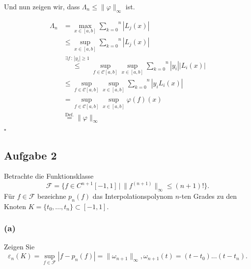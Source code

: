 \documentclass[11pt,a4paper,ngerman]{article}
\begin{document}
Und nun zeigen wir, dass $\Lambda_n \leq \|\varphi \|_\infty$ ist.

\begin{equation*}\begin{split}
    \Lambda_n &= \underset{x \in [a,b]}{\max} \overset{n}{\underset{k=0}{\sum}} |L_j(x)|\\
        &\leq \underset{x \in [a,b]}{\sup} \overset{n}{\underset{k=0}{\sum}} |L_j(x)|\\
        &\overset{\exists f\,:\,|y_i|\geq 1}{\leq} \underset{f \in \mathcal{C}[a,b]}{\sup} \underset{x \in [a,b]}{\sup} \overset{n}{\underset{k=0}{\sum}} |y_i||L_i(x)|\\
        &\leq \underset{f \in \mathcal{C}[a,b]}{\sup} \underset{x \in [a,b]}{\sup} \overset{n}{\underset{k=0}{\sum}} |y_i L_i(x)|\\
        &= \underset{f \in \mathcal{C}[a,b]}{\sup} \underset{x \in [a,b]}{\sup} \varphi(f)(x)\\
        &\stackrel{\text{Def.}}{=} \| \varphi \|_\infty
\end{split}\end{equation*}
\mbox{}\hfill$\square$

\subsection*{Aufgabe 2}

Betrachte die Funktionsklasse
\begin{equation*}
    \mathcal{F} = \{f \in C^{n+1}[-1,1] \, | \, \|f^{(n+1)}\|_\infty \leq (n+1)! \}.
\end{equation*}
Für $f \in \mathcal{F}$ bezeichne $p_n(f)$ das Interpolationspolynom $n$-ten Grades zu den Knoten
$K = \{t_0, ..., t_n \} \subset [-1,1]$.

\subsubsection*{(a)}

Zeigen Sie
\begin{equation*}
    \varepsilon_n(K) = \underset{f \in \mathcal{F}}{\sup} |f - p_n(f)| = \| \omega_{n+1} \|_\infty, \omega_{n+1}(t) = (t-t_0)...(t-t_n).
\end{equation*}
\end{document}
